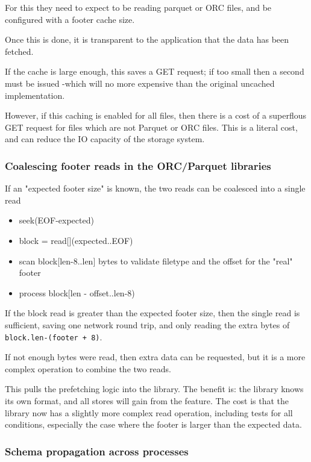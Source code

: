 \documentclass[manuscript]{acmart}
\begin{document}
For this they need to expect to be reading parquet or ORC files, and be configured
with a footer cache size.

Once this is done, it is transparent to the application that the data has been fetched.

If the cache is large enough, this saves a GET request; if too small then
a second must be issued -which will no more expensive than the original uncached
implementation.

However, if this caching is enabled for all files, then there is a cost
of a superflous GET request for files which are not Parquet or ORC files.
This is a literal cost, and can reduce the IO capacity of the storage system.

\subsubsection{Coalescing footer reads in the ORC/Parquet libraries}
If an "expected footer size" is known, the two reads can be coalesced into a single read

\begin{itemize}
  \item{seek(EOF-expected)}
  \item{block = read[](expected..EOF)}
  \item{scan block[len-8..len] bytes to validate filetype and the offset for the "real" footer}
  \item{process block[len - offset..len-8)}
\end{itemize}

If the block read is greater than the expected footer size, then the single read
is sufficient, saving one network round trip, and only reading the extra bytes of
\texttt{block.len-(footer + 8)}.

If not enough bytes were read, then extra data can be requested, but it is a more complex
operation to combine the two reads.

This pulls the prefetching logic into the library.
The benefit is: the library knows its own format, and all stores will gain from the feature.
The cost is that the library now has a slightly more complex read operation,
including tests for all conditions, especially the case where the footer is larger
than the expected data.

\subsubsection{Schema propagation across processes}
\end{document}
